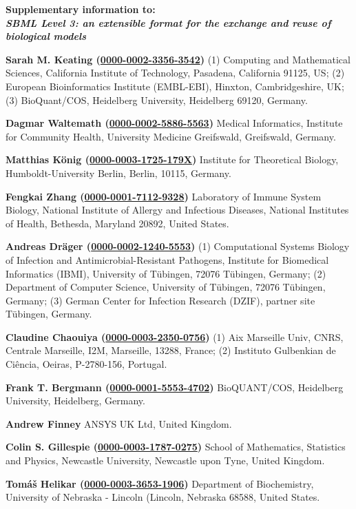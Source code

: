 \documentclass{sbml-paper}
\newcommand{\orcid}[1]{\href{https://orcid.org/#1}{#1}}
\begin{document}
\begin{center}\large\bfseries
Supplementary information to:\\
\emph{SBML Level 3: an extensible format for the exchange and reuse of biological models}
\end{center}

\textbf{Sarah M. Keating (\orcid{0000-0002-3356-3542})} (1) Computing and Mathematical Sciences, California Institute of Technology, Pasadena, California 91125, US; (2) European Bioinformatics Institute (EMBL-EBI), Hinxton, Cambridgeshire, UK; (3) BioQuant/COS, Heidelberg University, Heidelberg 69120, Germany.

\textbf{Dagmar Waltemath (\orcid{0000-0002-5886-5563})} Medical Informatics, Institute for Community Health, University Medicine Greifswald, Greifswald, Germany.

\textbf{Matthias K\"{o}nig (\orcid{0000-0003-1725-179X})} Institute for Theoretical Biology, Humboldt-University Berlin, Berlin, 10115, Germany.

\textbf{Fengkai Zhang (\orcid{0000-0001-7112-9328})} Laboratory of Immune System Biology, National Institute of Allergy and Infectious Diseases, National Institutes of Health, Bethesda, Maryland 20892, United States.

\textbf{Andreas Dräger (\orcid{0000-0002-1240-5553})} (1) Computational Systems Biology of Infection and Antimicrobial-Resistant Pathogens, Institute for Biomedical Informatics (IBMI), University of Tübingen, 72076 Tübingen, Germany; (2) Department of Computer Science, University of Tübingen, 72076 Tübingen, Germany; (3) German Center for Infection Research (DZIF), partner site Tübingen, Germany.

\textbf{Claudine Chaouiya (\orcid{0000-0003-2350-0756})} (1) Aix Marseille Univ, CNRS, Centrale Marseille, I2M, Marseille, 13288, France; (2) Instituto Gulbenkian de Ciência, Oeiras, P-2780-156, Portugal.

\textbf{Frank T. Bergmann (\orcid{0000-0001-5553-4702})} BioQUANT/COS, Heidelberg University, Heidelberg, Germany.

\textbf{Andrew Finney} ANSYS UK Ltd, United Kingdom.
	
\textbf{Colin S. Gillespie (\orcid{0000-0003-1787-0275})} School of Mathematics, Statistics and Physics, Newcastle University, Newcastle upon Tyne, United Kingdom.

\textbf{Tomáš Helikar (\orcid{0000-0003-3653-1906})} Department of Biochemistry, University of Nebraska - Lincoln (Lincoln, Nebraska 68588, United States.
\end{document}
